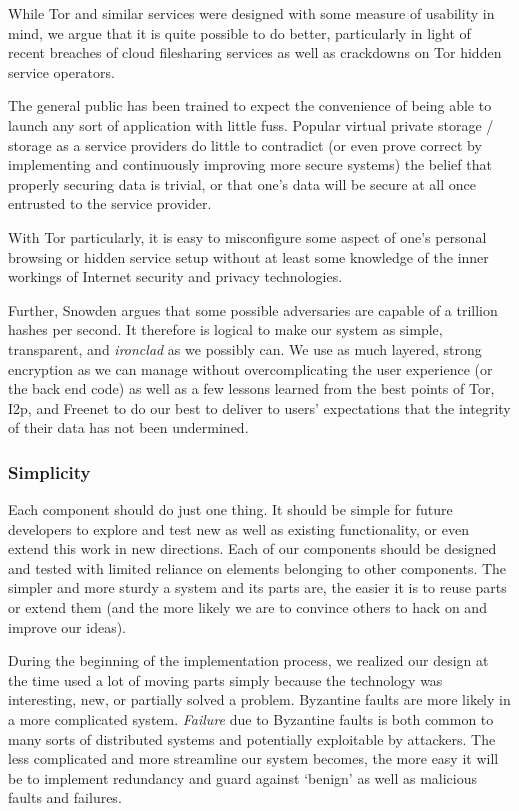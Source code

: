 While Tor and similar services were designed with some measure
of usability in mind, we argue that it is quite possible to do
better, particularly in light of recent breaches of cloud
filesharing services as well as crackdowns on Tor hidden service
operators.

The general public has been trained to expect the convenience of
being able to launch any sort of application with little fuss.
Popular virtual private storage / storage as a
service providers do little to contradict (or even prove correct
by implementing and continuously improving more secure systems)
the belief that properly securing data is trivial,
or that one's data will be secure at
all once entrusted to the service provider.

With Tor particularly, it is easy to misconfigure some aspect
of one's personal browsing or hidden service setup without
at least some knowledge of the inner workings of Internet
security and privacy technologies.

Further, Snowden argues that some possible adversaries are
capable of a trillion hashes per second. It therefore is logical
to make our system as simple, transparent, and \textit{ironclad}
as we possibly can. We use as much layered, strong encryption as
we can manage without overcomplicating the user experience (or the
back end code) as well as a few lessons learned from the best
points of Tor, I2p, and Freenet to do our best to deliver to
users' expectations that the integrity of their data has not
been undermined.

\subsubsection*{Simplicity}

Each component should do just one thing. It should be simple
for future developers to explore and test new as well as existing
functionality, or even extend this work in new directions.
Each of our components should be designed and tested with limited
reliance on elements belonging to other components.
The simpler and more sturdy a system and its parts are, the easier
it is to reuse parts or extend them (and the more likely we
are to convince others to hack on and improve our ideas).

During the beginning of the implementation process, we realized
our design at the time used a lot of moving parts simply because
the technology was interesting, new, or partially solved a problem.
Byzantine faults are more likely in a more complicated system.
\textit{Failure} due to Byzantine faults is both common to many
sorts of distributed systems and potentially exploitable by
attackers. The less complicated and more streamline our system
becomes, the more easy it will be to implement redundancy and
guard against `benign' as well as malicious faults and failures.


